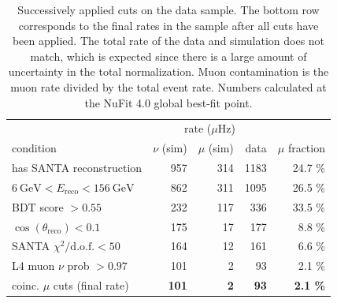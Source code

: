 \begin{table}
\caption{Successively applied cuts on the data sample. The bottom row corresponds to the final rates in the sample after all cuts have been applied. The total rate of the data and simulation does not match, which is expected since there is a large amount of uncertainty in the total normalization. Muon contamination is the muon rate divided by the total event rate. Numbers calculated at the NuFit 4.0 global best-fit point.}
\centering
\begin{tabular}{@{}lrrrr@{}}\toprule
& \multicolumn{3}{c}{rate ($\mu$Hz)} & \\ \cmidrule{2-4}
condition                              & {$\nu$ (sim)} & {$\mu$ (sim)} & {data} & {$\mu$ fraction} \\ \midrule
has SANTA reconstruction         & 957  & 314  & 1183 & 24.7 \%  \\
$\SI{6}{\giga\electronvolt} < E_\mathrm{reco}  < \SI{156}{\giga\electronvolt}$         & 862  & 311  & 1095 & 26.5 \%  \\
BDT score $>0.55$                      & 232  & 117  &  336 & 33.5 \%  \\
$\cos(\theta_{\mathrm{reco}}) < 0.1$   & 175  &  17  &  177 & 8.8 \%   \\
SANTA $\chi^2/\mathrm{d.o.f.} < 50$    & 164  &  12  &  161 & 6.6 \%   \\
L4 muon $\nu$ prob $> 0.97$            & 101  &   2  &   93 & 2.1 \% \\
\midrule\addlinespace
coinc. $\mu$ cuts (final rate) & \textbf{101} & \textbf{2} & \textbf{93} & \textbf{2.1 \%} \\ \bottomrule
\end{tabular}
\label{tab:muon-rejection-cut-rates}
\end{table}

%    
%    


